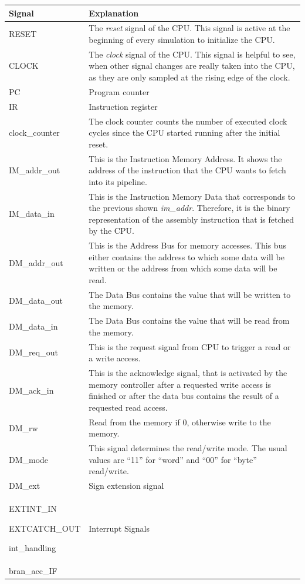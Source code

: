 \documentclass[
]{article}
\begin{document}
\begin{longtable}[]{@{}ll@{}}
\toprule
\textbf{Signal} & \textbf{Explanation}\tabularnewline
\midrule
\endhead
RESET & The \emph{reset} signal of the CPU. This signal is active at the
beginning of every simulation to initialize the CPU.\tabularnewline
CLOCK & The \emph{clock} signal of the CPU. This signal is helpful to
see, when other signal changes are really taken into the CPU, as they
are only sampled at the rising edge of the clock.\tabularnewline
PC & Program counter\tabularnewline
IR & Instruction register\tabularnewline
clock\_counter & The clock counter counts the number of executed clock
cycles since the CPU started running after the initial
reset.\tabularnewline
IM\_addr\_out & This is the Instruction Memory Address. It shows the
address of the instruction that the CPU wants to fetch into its
pipeline.\tabularnewline
IM\_data\_in & This is the Instruction Memory Data that corresponds to
the previous shown \emph{im\_addr}. Therefore, it is the binary
representation of the assembly instruction that is fetched by the
CPU.\tabularnewline
DM\_addr\_out & This is the Address Bus for memory accesses. This bus
either contains the address to which some data will be written or the
address from which some data will be read.\tabularnewline
DM\_data\_out & The Data Bus contains the value that will be written to
the memory.\tabularnewline
DM\_data\_in & The Data Bus contains the value that will be read from
the memory.\tabularnewline
DM\_req\_out & This is the request signal from CPU to trigger a read or
a write access.\tabularnewline
DM\_ack\_in & This is the acknowledge signal, that is activated by the
memory controller after a requested write access is finished or after
the data bus contains the result of a requested read
access.\tabularnewline
DM\_rw & Read from the memory if 0, otherwise write to the
memory.\tabularnewline
DM\_mode & This signal determines the read/write mode. The usual values
are ``11'' for ``word'' and ``00'' for ``byte''
read/write.\tabularnewline
DM\_ext & Sign extension signal\tabularnewline
\begin{minipage}[t]{0.47\columnwidth}\raggedright
EXTINT\_IN

EXTCATCH\_OUT

int\_handling\strut
\end{minipage} & \begin{minipage}[t]{0.47\columnwidth}\raggedright
Interrupt Signals\strut
\end{minipage}\tabularnewline
\begin{minipage}[t]{0.47\columnwidth}\raggedright
bran\_acc\_IF


\end{minipage}
\end{longtable}
\end{document}
